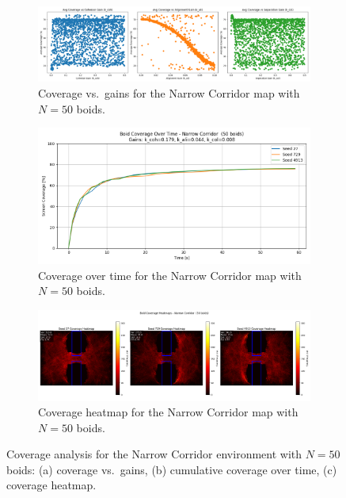 \documentclass[12pt]{article}
\begin{document}
\begin{figure}[h!]
  \centering
  \begin{subfigure}[b]{0.32\linewidth}
    \includegraphics[width=\linewidth]{cov_vs_gains/narrow_50.png}
    \caption{Coverage vs.~gains for the Narrow Corridor map with $N=50$ boids.}
    \label{fig:app:narrow50_gains}
  \end{subfigure}\hfill
  \begin{subfigure}[b]{0.32\linewidth}
    \includegraphics[width=\linewidth]{optimal_cov_vs_time/narrow_50.png}
    \caption{Coverage over time for the Narrow Corridor map with $N=50$ boids.}
    \label{fig:app:narrow50_time}
  \end{subfigure}\hfill
  \begin{subfigure}[b]{0.32\linewidth}
    \includegraphics[width=\linewidth]{heatmaps/narrow_50.png}
    \caption{Coverage heatmap for the Narrow Corridor map with $N=50$ boids.}
    \label{fig:app:narrow50_heat}
  \end{subfigure}
  \caption{Coverage analysis for the Narrow Corridor environment with $N=50$ boids: (a) coverage vs.~gains, (b) cumulative coverage over time, (c) coverage heatmap.}
  \label{fig:app:narrow50}
\end{figure}
\end{document}
